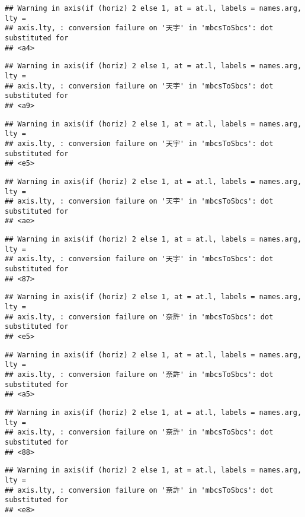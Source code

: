 \documentclass[
]{article}
\begin{document}
\begin{verbatim}
## Warning in axis(if (horiz) 2 else 1, at = at.l, labels = names.arg, lty =
## axis.lty, : conversion failure on '天宇' in 'mbcsToSbcs': dot substituted for
## <a4>
\end{verbatim}

\begin{verbatim}
## Warning in axis(if (horiz) 2 else 1, at = at.l, labels = names.arg, lty =
## axis.lty, : conversion failure on '天宇' in 'mbcsToSbcs': dot substituted for
## <a9>
\end{verbatim}

\begin{verbatim}
## Warning in axis(if (horiz) 2 else 1, at = at.l, labels = names.arg, lty =
## axis.lty, : conversion failure on '天宇' in 'mbcsToSbcs': dot substituted for
## <e5>
\end{verbatim}

\begin{verbatim}
## Warning in axis(if (horiz) 2 else 1, at = at.l, labels = names.arg, lty =
## axis.lty, : conversion failure on '天宇' in 'mbcsToSbcs': dot substituted for
## <ae>
\end{verbatim}

\begin{verbatim}
## Warning in axis(if (horiz) 2 else 1, at = at.l, labels = names.arg, lty =
## axis.lty, : conversion failure on '天宇' in 'mbcsToSbcs': dot substituted for
## <87>
\end{verbatim}

\begin{verbatim}
## Warning in axis(if (horiz) 2 else 1, at = at.l, labels = names.arg, lty =
## axis.lty, : conversion failure on '奈許' in 'mbcsToSbcs': dot substituted for
## <e5>
\end{verbatim}

\begin{verbatim}
## Warning in axis(if (horiz) 2 else 1, at = at.l, labels = names.arg, lty =
## axis.lty, : conversion failure on '奈許' in 'mbcsToSbcs': dot substituted for
## <a5>
\end{verbatim}

\begin{verbatim}
## Warning in axis(if (horiz) 2 else 1, at = at.l, labels = names.arg, lty =
## axis.lty, : conversion failure on '奈許' in 'mbcsToSbcs': dot substituted for
## <88>
\end{verbatim}

\begin{verbatim}
## Warning in axis(if (horiz) 2 else 1, at = at.l, labels = names.arg, lty =
## axis.lty, : conversion failure on '奈許' in 'mbcsToSbcs': dot substituted for
## <e8>
\end{verbatim}
\end{document}
